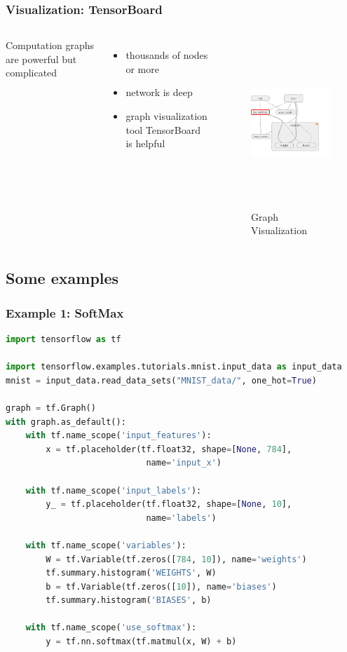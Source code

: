\begin{frame}
  \MyLogo
  \frametitle{Visualization: TensorBoard}  

\begin{columns}
\scriptsize{
Computation graphs are powerful but complicated
\begin{itemize}
\item  thousands of nodes or more 
\item  network is deep
\item  graph visualization tool TensorBoard is helpful
\end{itemize}
}
%
\begin{figure}[htbp] 
   \includegraphics[height=2.5in]{figures/graphvisualization.png} 
\caption{Graph Visualization}
\end{figure}
\end{columns}

\end{frame}

\subsection{Some examples}

\begin{frame}[fragile]
  \MyLogo
  \frametitle{Example 1: SoftMax}  
 
\scriptsize{
\begin{lstlisting}[language=python]
import tensorflow as tf

import tensorflow.examples.tutorials.mnist.input_data as input_data
mnist = input_data.read_data_sets("MNIST_data/", one_hot=True)

graph = tf.Graph()
with graph.as_default():
	with tf.name_scope('input_features'):
		x = tf.placeholder(tf.float32, shape=[None, 784], 
							name='input_x')
							
	with tf.name_scope('input_labels'):
		y_ = tf.placeholder(tf.float32, shape=[None, 10], 
							name='labels')
							
	with tf.name_scope('variables'):
		W = tf.Variable(tf.zeros([784, 10]), name='weights')
		tf.summary.histogram('WEIGHTS', W)
		b = tf.Variable(tf.zeros([10]), name='biases')
		tf.summary.histogram('BIASES', b)
			
	with tf.name_scope('use_softmax'):
		y = tf.nn.softmax(tf.matmul(x, W) + b)
\end{lstlisting}
}
\end{frame}

